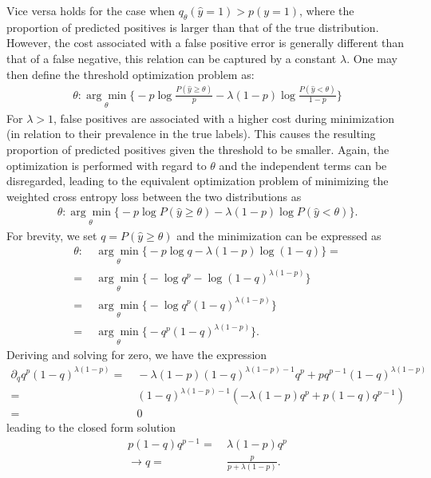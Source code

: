 \documentclass{article}
\begin{document}
Vice versa holds for the case when $q_\theta(\hat{y}=1) > p(y=1)$, where the proportion of predicted positives is larger than that of the true distribution.
However, the cost associated with a false positive error is generally different than that of a false negative, this relation can be captured by a constant $\lambda$. One may then define the threshold optimization problem as:  
\begin{align}
    \theta: \underset{\theta}{\arg \min} \Big\{ - p \log \frac{P(\hat{y}\geq \theta)}{p} - \lambda (1-p) \log \frac{P(\hat{y} < \theta)}{1-p} \Big \}
\end{align}
For $\lambda>1$, false positives are associated with a higher cost during minimization (in relation to their prevalence in the true labels). This causes the resulting proportion of predicted positives given the threshold to be smaller. %
Again, the optimization is performed with regard to $\theta$ and the independent terms can be disregarded, leading to the equivalent optimization problem of minimizing the weighted cross entropy loss between the two distributions as
\begin{align}
\label{eq:threshold} 
\theta: \underset{\theta}{\arg \min} \Big\{ - p \log P(\hat{y}\geq \theta) - \lambda (1-p) \log P(\hat{y} < \theta) \Big \} \text{.}
\end{align}
For brevity, we set $q = P(\hat{y}\geq \theta)$ and the minimization can be expressed as
\begin{align*}
\theta:& \ \underset{\theta}{\arg \min} \Big\{ - p \log q - \lambda (1-p) \log (1-q) \Big \} = \\
=& \ \underset{\theta}{\arg \min} \Big\{ - \log q^p - \log (1-q)^{\lambda(1-p)} \Big \} \\
=& \ \underset{\theta}{\arg \min} \Big\{ - \log q^p (1-q)^{\lambda(1-p)} \Big \} \\
=& \ \underset{\theta}{\arg \min} \Big\{ - q^p (1-q)^{\lambda(1-p)} \Big \} \text{.}
\end{align*}
Deriving and solving for zero, we have the expression
\begin{align*}
\partial_q q^p (1-q)^{\lambda(1-p)} =& \ -\lambda(1-p)(1-q)^{\lambda(1-p)-1}q^p + pq^{p-1}(1-q)^{\lambda(1-p)} \\
=& \ (1-q)^{\lambda(1-p)-1}(-\lambda(1-p)q^p + p(1-q)q^{p-1}) \\
=& \ 0
\end{align*}
leading to the closed form solution
\begin{align}
p(1-q)q^{p-1} =& \ \lambda(1-p)q^p \\
\rightarrow q =& \ \frac{p}{p + \lambda(1-p)}\text{.}
\label{eq:pos}
\end{align}
\end{document}
